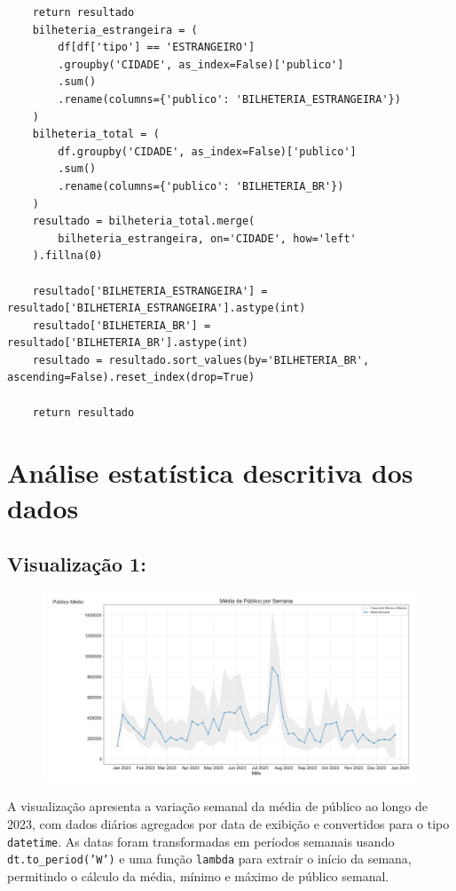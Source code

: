 \documentclass{article}
\begin{document}
\begin{lstlisting}
    return resultado
    bilheteria_estrangeira = (
        df[df['tipo'] == 'ESTRANGEIRO']
        .groupby('CIDADE', as_index=False)['publico']
        .sum()
        .rename(columns={'publico': 'BILHETERIA_ESTRANGEIRA'})
    )
    bilheteria_total = (
        df.groupby('CIDADE', as_index=False)['publico']
        .sum()
        .rename(columns={'publico': 'BILHETERIA_BR'})
    )
    resultado = bilheteria_total.merge(
        bilheteria_estrangeira, on='CIDADE', how='left'
    ).fillna(0)

    resultado['BILHETERIA_ESTRANGEIRA'] = resultado['BILHETERIA_ESTRANGEIRA'].astype(int)
    resultado['BILHETERIA_BR'] = resultado['BILHETERIA_BR'].astype(int)
    resultado = resultado.sort_values(by='BILHETERIA_BR', ascending=False).reset_index(drop=True)

    return resultado

\end{lstlisting}

\pagebreak
\linespread{1.5}
\section{Análise estatística descritiva dos dados}
\subsection*{Visualização 1:}
\begin{figure}[H]
    \centerline{\includegraphics[width =\linewidth]{img/Figure_1.png}}
\end{figure}
A visualização apresenta a variação semanal da média de público ao longo de 2023, com dados diários agregados por data de exibição e convertidos para o tipo \texttt{datetime}. As datas foram transformadas em períodos semanais usando \texttt{dt.to\_period('W')} e uma função \texttt{lambda} para extrair o início da semana, permitindo o cálculo da média, mínimo e máximo de público semanal.
\end{document}
